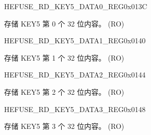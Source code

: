 \begin{register}{H}{EFUSE\_RD\_KEY5\_DATA0\_REG}{0x013C}\label{regdesc:EFUSERDKEY5DATA0REG}
%
\regnewline%
\begin{regdesc}\begin{reglist}
\label{fielddesc:EFUSEKEY5DATA0}\item [EFUSE\_KEY5\_DATA0] 存储 KEY5 第 0 个 32 位内容。 (RO)
\end{reglist}\end{regdesc}
\end{register}


\begin{register}{H}{EFUSE\_RD\_KEY5\_DATA1\_REG}{0x0140}\label{regdesc:EFUSERDKEY5DATA1REG}
%
\regnewline%
\begin{regdesc}\begin{reglist}
\label{fielddesc:EFUSEKEY5DATA1}\item [EFUSE\_KEY5\_DATA1] 存储 KEY5 第 1 个 32 位内容。 (RO)
\end{reglist}\end{regdesc}
\end{register}


\begin{register}{H}{EFUSE\_RD\_KEY5\_DATA2\_REG}{0x0144}\label{regdesc:EFUSERDKEY5DATA2REG}
%
\regnewline%
\begin{regdesc}\begin{reglist}
\label{fielddesc:EFUSEKEY5DATA2}\item [EFUSE\_KEY5\_DATA2] 存储 KEY5 第 2 个 32 位内容。 (RO)
\end{reglist}\end{regdesc}
\end{register}


\begin{register}{H}{EFUSE\_RD\_KEY5\_DATA3\_REG}{0x0148}\label{regdesc:EFUSERDKEY5DATA3REG}
%
\regnewline%
\begin{regdesc}\begin{reglist}
\label{fielddesc:EFUSEKEY5DATA3}\item [EFUSE\_KEY5\_DATA3] 存储 KEY5 第 3 个 32 位内容。 (RO)
\end{reglist}\end{regdesc}
\end{register}


